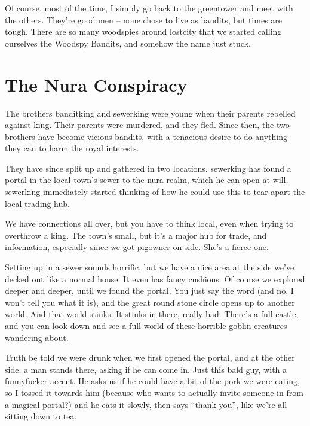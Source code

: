 \begin{multicols}{2}
\begin{exampletext}
	Of course, most of the time, I simply go back to the \gls{greentower} and meet with the others.
	They're good men -- none chose to live as bandits, but times are tough.
	There are so many woodspies around \gls{lostcity} that we started calling ourselves the Woodspy Bandits, and somehow the name just stuck.

\end{exampletext}

\end{multicols}

\section{The Nura Conspiracy}

\begin{multicols}{2}

\noindent
The brothers \gls{banditking} and \gls{sewerking} were young when their parents rebelled against \gls{king}.
Their parents were murdered, and they fled.
Since then, the two brothers have become vicious bandits, with a tenacious desire to do anything they can to harm the royal interests.

They have since split up and gathered in two locations.
\Gls{sewerking} has found a portal in the local town's sewer to the nura realm, which he can open at will.
\Gls{sewerking} immediately started thinking of how he could use this to tear apart the local trading hub.

\begin{exampletext}

	We have connections all over, but you have to think local, even when trying to overthrow a king.  The town's small, but it's a major hub for trade, and information, especially since we got \gls{pigowner} on side.  She's a fierce one.

	Setting up in a sewer sounds horrific, but we have a nice area at the side we've decked out like a normal house.
	It even has fancy cushions.
	Of course we explored deeper and deeper, until we found the portal.
	You just say the word (and no, I won't tell you what it is), and the great round stone circle opens up to another world.
	And that world stinks.
	It stinks in there, really bad.
	There's a full castle, and you can look down and see a full world of these horrible goblin creatures wandering about.

	Truth be told we were drunk when we first opened the portal, and at the other side, a man stands there, asking if he can come in.
	Just this bald guy, with a funnyfucker accent.
	He asks us if he could have a bit of the pork we were eating, so I tossed it towards him (because who wants to actually invite someone in from a magical portal?) and he eats it slowly, then says ``thank you'', like we're all sitting down to tea.


\end{exampletext}
\end{multicols}
